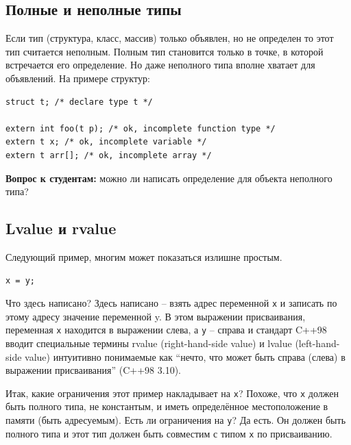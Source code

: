 \documentclass[a4paper,12pt,oneside]{book}
\newif\ifanswers
\begin{document}
\subsection{Полные и неполные типы}

Если тип (структура, класс, массив) только объявлен, но не определен то этот тип считается неполным. Полным тип становится только в точке, в которой встречается его определение. Но даже неполного типа вполне хватает для объявлений. На примере структур:

\begin{lstlisting}
struct t; /* declare type t */

extern int foo(t p); /* ok, incomplete function type */
extern t x; /* ok, incomplete variable */
extern t arr[]; /* ok, incomplete array */
\end{lstlisting}

\textbf{Вопрос к студентам:} можно ли написать определение для объекта неполного типа?

\ifanswers
Правильный ответ: конечно нет, так как неизвестно сколько памяти надо такому объекту. Но можно написать определение указателя на такой объект.
\fi

\subsection{Lvalue и rvalue}\label{LRvalues}

Следующий пример, многим может показаться излишне простым.

\begin{lstlisting}
x = y;
\end{lstlisting}

Что здесь написано? Здесь написано – взять адрес переменной \lstinline!x! и записать по этому адресу значение переменной y. В этом выражении присваивания, переменная \lstinline!x! находится в выражении слева, а \lstinline!y! -- справа и стандарт C++98 вводит специальные термины rvalue (right-hand-side value) и lvalue (left-hand-side value) интуитивно понимаемые как ``нечто, что может быть справа (слева) в выражении присваивания'' (C++98 3.10). 

Итак, какие ограничения этот пример накладывает на \lstinline!x!? Похоже, что \lstinline!x! должен быть полного типа, не константым, и иметь определённое местоположение в памяти (быть адресуемым). Есть ли ограничения на \lstinline!y!? Да есть. Он должен быть полного типа и этот тип должен быть совместим с типом \lstinline!x! по присваиванию.  
\end{document}
